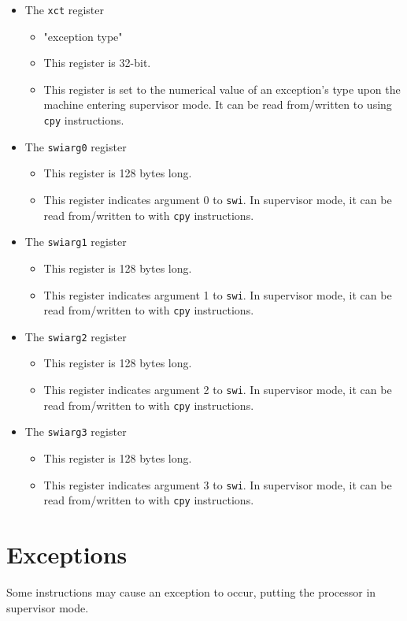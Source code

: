 \documentclass{article}
\begin{document}
\begin{itemize}
	\item The \texttt{xct} register
		\begin{itemize}
		\item "exception type"
		\item This register is 32-bit.
		\item This register is set to the numerical value of an exception's
			type upon the machine entering supervisor mode. It can be read
			from/written to using \texttt{cpy} instructions.
		\end{itemize}
	\item The \texttt{swiarg0} register
		\begin{itemize}
		\item This register is 128 bytes long.
		\item This register indicates argument 0 to \texttt{swi}. In
			supervisor mode, it can be read from/written to with
			\texttt{cpy} instructions.
		\end{itemize}
	\item The \texttt{swiarg1} register
		\begin{itemize}
		\item This register is 128 bytes long.
		\item This register indicates argument 1 to \texttt{swi}. In
			supervisor mode, it can be read from/written to with
			\texttt{cpy} instructions.
		\end{itemize}
	\item The \texttt{swiarg2} register
		\begin{itemize}
		\item This register is 128 bytes long.
		\item This register indicates argument 2 to \texttt{swi}. In
			supervisor mode, it can be read from/written to with
			\texttt{cpy} instructions.
		\end{itemize}
	\item The \texttt{swiarg3} register
		\begin{itemize}
		\item This register is 128 bytes long.
		\item This register indicates argument 3 to \texttt{swi}. In
			supervisor mode, it can be read from/written to with
			\texttt{cpy} instructions.
		\end{itemize}
	\end{itemize}
	\newpage
\section{Exceptions}
	Some instructions may cause an exception to occur, putting the
	processor in supervisor mode.
\end{document}
